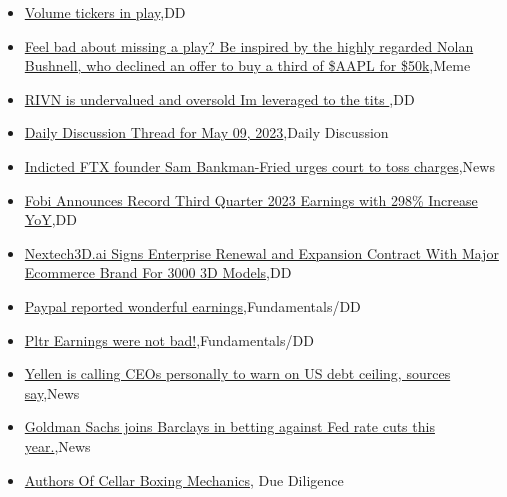 \documentclass{article}%
\begin{document}
%
\begin{itemize}%
\item%
\href{https://reddit.com/r/wallstreetbets/comments/13cnosd/volume\_tickers\_in\_play/}{Volume tickers in play},DD%
\item%
\href{https://reddit.com/r/wallstreetbets/comments/13cndqs/feel\_bad\_about\_missing\_a\_play\_be\_inspired\_by\_the/}{Feel bad about missing a play? Be inspired by the highly regarded Nolan Bushnell, who declined an offer to buy a third of \$AAPL for \$50k},Meme%
\item%
\href{https://reddit.com/r/wallstreetbets/comments/13cn3hx/rivn\_is\_undervalued\_and\_oversold\_im\_leveraged\_to/}{RIVN is undervalued and oversold Im leveraged to the tits },DD%
\item%
\href{https://reddit.com/r/wallstreetbets/comments/13cl6jm/daily\_discussion\_thread\_for\_may\_09\_2023/}{Daily Discussion Thread for May 09, 2023},Daily Discussion%
\item%
\href{https://reddit.com/r/wallstreetbets/comments/13ci0l5/indicted\_ftx\_founder\_sam\_bankmanfried\_urges\_court/}{Indicted FTX founder Sam Bankman-Fried urges court to toss charges},News%
\item%
\href{https://reddit.com/r/Baystreetbets/comments/13cp7b2/fobi\_announces\_record\_third\_quarter\_2023\_earnings/}{Fobi Announces Record Third Quarter 2023 Earnings with 298\% Increase YoY},DD%
\item%
\href{https://reddit.com/r/Baystreetbets/comments/13coyti/nextech3dai\_signs\_enterprise\_renewal\_and/}{Nextech3D.ai Signs Enterprise Renewal and Expansion Contract With Major Ecommerce Brand For 3000 3D Models},DD%
\item%
\href{https://reddit.com/r/StockMarket/comments/13c6h05/paypal\_reported\_wonderful\_earnings/}{Paypal reported wonderful earnings},Fundamentals/DD%
\item%
\href{https://reddit.com/r/StockMarket/comments/13c52yp/pltr\_earnings\_were\_not\_bad/}{Pltr Earnings were not bad!},Fundamentals/DD%
\item%
\href{https://reddit.com/r/Economics/comments/13cj3b4/yellen\_is\_calling\_ceos\_personally\_to\_warn\_on\_us/}{Yellen is calling CEOs personally to warn on US debt ceiling, sources say},News%
\item%
\href{https://reddit.com/r/Economics/comments/13ci0d0/goldman\_sachs\_joins\_barclays\_in\_betting\_against/}{Goldman Sachs joins Barclays in betting against Fed rate cuts this year.},News%
\item%
\href{https://reddit.com/r/Superstonk/comments/13cpeox/authors\_of\_cellar\_boxing\_mechanics/}{Authors Of Cellar Boxing Mechanics}, Due Diligence%
\end{itemize}%
\end{document}

